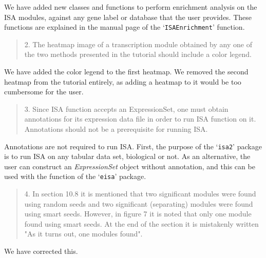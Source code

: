 \documentclass[a4paper]{article}
\newcommand{\Rpackage}[1]{`\texttt{#1}'}
\newcommand{\Rfunction}[1]{`\texttt{#1}'}
\newcommand{\Rclass}[1]{\textsl{#1}}
\begin{document}
We have added new classes and functions to perform enrichment analysis
on the ISA modules, against any gene label or database that the user
provides. These functions are explained in the manual page of the
\Rfunction{ISAEnrichment} function.

\begin{quote}
2.      The heatmap image of a transcription module obtained by any
one of the two methods presented in the tutorial should include a
color legend. 
\end{quote}

We have added the color legend to the first heatmap. We removed the 
second heatmap from the tutorial entirely, as adding a heatmap to 
it would be too cumbersome for the user.

\begin{quote}
3.      Since ISA function accepts an ExpressionSet, one must obtain
annotations for its expression data file in order to run ISA function
on it. Annotations should not be a prerequisite for running ISA. 
\end{quote}

Annotations are not required to run ISA. First, the purpose of the
\Rpackage{isa2} package is to run ISA on any tabular data set,
biological or not. As an alternative, the user can construct an
\Rclass{ExpressionSet} object without annotation, and this can be used
with the function of the \Rpackage{eisa} package.

\begin{quote}
4.      In section 10.8 it is mentioned that two significant modules
were found using random seeds and two significant (separating) modules
were found using smart seeds. However, in figure 7 it is noted that
only one module found using smart seeds. At the end of the section it
is mistakenly written "As it turns out, one modules found". 
\end{quote}

We have corrected this.



\end{document}

